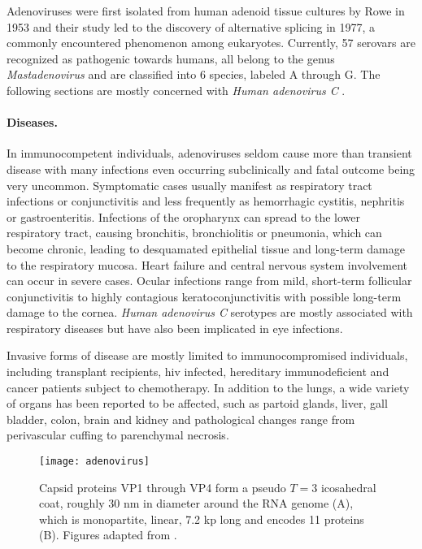 Adenoviruses were first isolated from human adenoid tissue cultures by Rowe in 1953 and their study led to the discovery of alternative splicing in 1977, a commonly encountered phenomenon among eukaryotes. Currently, 57 serovars are recognized as pathogenic towards humans, all belong to the genus \textit{Mastadenovirus} and are classified into 6 species, labeled A through G. The following sections are mostly concerned with \textit{Human adenovirus C} \citep{Lenaerts2008}.

\paragraph{Diseases.}
In immunocompetent individuals, adenoviruses seldom cause more than transient disease with many infections even occurring subclinically and fatal outcome being very uncommon. Symptomatic cases usually manifest as respiratory tract infections or conjunctivitis and less frequently as hemorrhagic cystitis, nephritis or gastroenteritis. Infections of the oropharynx can spread to the lower respiratory tract, causing bronchitis, bronchiolitis or pneumonia, which can become chronic, leading to desquamated epithelial tissue and long-term damage to the respiratory mucosa. Heart failure and central nervous system involvement can occur in severe cases. Ocular infections range from mild, short-term follicular conjunctivitis to highly contagious keratoconjunctivitis with possible long-term damage to the cornea. \textit{Human adenovirus C} serotypes are mostly associated with respiratory diseases but have also been implicated in eye infections.

Invasive forms of disease are mostly limited to immunocompromised individuals, including transplant recipients, \gls{hiv} infected, hereditary immunodeficient and cancer patients subject to chemotherapy. In addition to the lungs, a wide variety of organs has been reported to be affected, such as partoid glands, liver, gall bladder, colon, brain and kidney and pathological changes range from perivascular cuffing to parenchymal necrosis.

\begin{figure}
  \centering
  \texttt{[image: adenovirus]}
  \caption[Capsid structure and genome of rhinoviruses.]{Capsid proteins VP1 through VP4 form a pseudo $T=3$ icosahedral coat, roughly 30 nm in diameter around the RNA genome (A), which is monopartite, linear, 7.2 kp long and encodes 11 proteins (B). Figures adapted from \cite{Hulo2011}.}
  \label{fig:adenovirus}
\end{figure}

